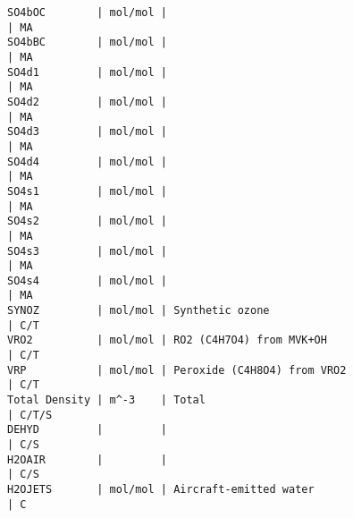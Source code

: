{\begin{verbatim}
SO4bOC        | mol/mol |                                                 | MA
SO4bBC        | mol/mol |                                                 | MA
SO4d1         | mol/mol |                                                 | MA
SO4d2         | mol/mol |                                                 | MA
SO4d3         | mol/mol |                                                 | MA
SO4d4         | mol/mol |                                                 | MA
SO4s1         | mol/mol |                                                 | MA
SO4s2         | mol/mol |                                                 | MA
SO4s3         | mol/mol |                                                 | MA
SO4s4         | mol/mol |                                                 | MA
SYNOZ         | mol/mol | Synthetic ozone                                 | C/T
VRO2          | mol/mol | RO2 (C4H7O4) from MVK+OH                        | C/T
VRP           | mol/mol | Peroxide (C4H8O4) from VRO2                     | C/T
Total Density | m^-3    | Total                                           | C/T/S
DEHYD         |         |                                                 | C/S
H2OAIR        |         |                                                 | C/S
H2OJETS       | mol/mol | Aircraft-emitted water                          | C
\end{verbatim}
}
